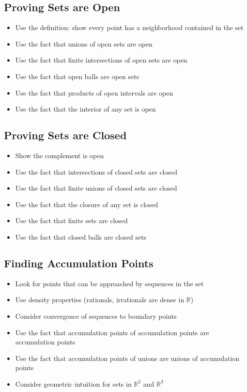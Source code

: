 \subsection*{Proving Sets are Open}
\begin{itemize}
\item Use the definition: show every point has a neighborhood contained in the set
\item Use the fact that unions of open sets are open
\item Use the fact that finite intersections of open sets are open
\item Use the fact that open balls are open sets
\item Use the fact that products of open intervals are open
\item Use the fact that the interior of any set is open
\end{itemize}

\subsection*{Proving Sets are Closed}
\begin{itemize}
\item Show the complement is open
\item Use the fact that intersections of closed sets are closed
\item Use the fact that finite unions of closed sets are closed
\item Use the fact that the closure of any set is closed
\item Use the fact that finite sets are closed
\item Use the fact that closed balls are closed sets
\end{itemize}

\subsection*{Finding Accumulation Points}
\begin{itemize}
\item Look for points that can be approached by sequences in the set
\item Use density properties (rationals, irrationals are dense in $\mathbb{R}$)
\item Consider convergence of sequences to boundary points
\item Use the fact that accumulation points of accumulation points are accumulation points
\item Use the fact that accumulation points of unions are unions of accumulation points
\item Consider geometric intuition for sets in $\mathbb{R}^2$ and $\mathbb{R}^3$
\end{itemize}

